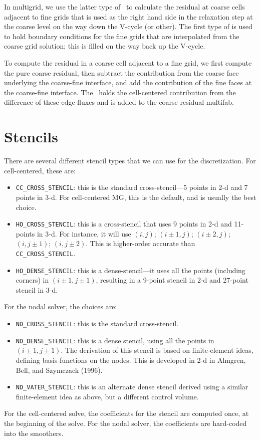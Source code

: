 In multigrid, we use the latter type of \bndryreg\ to calculate the 
residual at coarse cells adjacent to fine grids that is used as the right hand side
in the relaxation step at the coarse level on the way down the V-cycle (or other).  
The first type of \bndryreg is used to hold boundary conditions for the fine grids 
that are interpolated from the coarse grid solution; this is filled on the way back up the V-cycle.

To compute the residual in a coarse cell adjacent to a fine grid, we first
compute the pure coarse residual, then subtract the contribution from the coarse
face underlying the coarse-fine interface, and add the contribution of the fine
faces at the coarse-fine interface.  The \bndryreg\ holds the cell-centered
contribution from the difference of these edge fluxes and is added to
the coarse residual multifab.

\section{Stencils}

There are several different stencil types that we can use for 
the discretization.  For cell-centered, these are:
\begin{itemize}
\item {\tt CC\_CROSS\_STENCIL}: this is the standard cross-stencil---5 points 
in 2-d and 7 points in 3-d.  For cell-centered MG, this is the default, and
is usually the best choice.

\item {\tt HO\_CROSS\_STENCIL}: this is a cross-stencil that uses 9 points
in 2-d and 11-points in 3-d.  For instance, it will use $(i,j)$;
$(i\pm1,j)$; $(i\pm2,j)$; $(i,j\pm1)$; $(i,j\pm2)$.  This is
higher-order accurate than {\tt CC\_CROSS\_STENCIL}.

\item {\tt HO\_DENSE\_STENCIL}: this is a dense-stencil---it uses all the
points (including corners) in $(i\pm1,j\pm1)$, resulting in a 9-point stencil
in 2-d and 27-point stencil in 3-d.
\end{itemize}

For the nodal solver, the choices are:
\begin{itemize}
\item {\tt ND\_CROSS\_STENCIL}: this is the standard cross-stencil.

\item {\tt ND\_DENSE\_STENCIL}: this is a dense stencil, using
  all the points in $(i\pm1,j\pm1)$.  The 
  derivation of this stencil is based on finite-element ideas, defining
  basis functions on the nodes.  This is developed in 2-d in 
  Almgren, Bell, and Szymczack (1996).

\item {\tt ND\_VATER\_STENCIL}: this is an alternate dense stencil derived
  using a similar finite-element idea as above, but a different control
  volume.
\end{itemize}
For the cell-centered solve, the coefficients for the stencil are computed
once, at the beginning of the solve.  For the nodal solver, the coefficients
are hard-coded into the smoothers.

